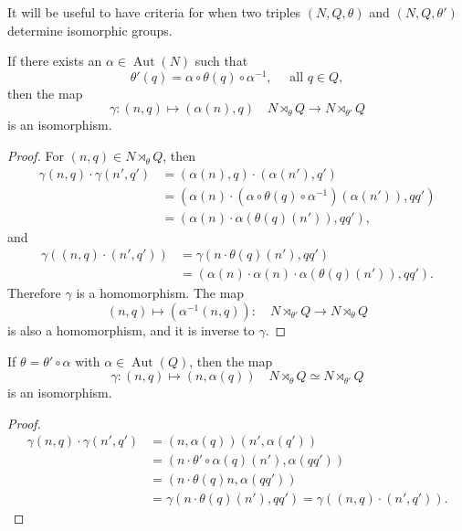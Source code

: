 It will be useful to have criteria for when two triples \( (N, Q, \theta) \) and \( (N, Q, \theta') \) determine isomorphic groups.

\begin{lemma}
  \label{lemma-criteria-semidirect-product-1}
  If there exists an \( \alpha \in \operatorname{Aut}(N) \) such that
  \[
    \theta'(q) = \alpha \circ \theta(q) \circ \alpha^{-1},\quad \text{ all } q \in Q,
  \]
  then the map
  \[
    \gamma: (n, q) \mapsto (\alpha(n), q)\quad N \rtimes_\theta Q \to N \rtimes_{\theta'} Q
  \]
  is an isomorphism.
\end{lemma}
\begin{proof}
  For \( (n, q) \in N \rtimes_\theta Q \), then
  \begin{align*}
    \gamma(n, q) \cdot \gamma(n', q') &= (\alpha(n), q) \cdot (\alpha(n'), q')\\
                                      &=(\alpha(n)\cdot(\alpha \circ \theta(q) \circ \alpha^{-1})(\alpha(n')), qq')\\
                                      &= (\alpha(n) \cdot \alpha(\theta(q)(n')), qq'),
  \end{align*}
  and
  \begin{align*}
    \gamma((n, q) \cdot (n', q')) &= \gamma(n \cdot \theta(q)(n'), qq')\\
                                  &= (\alpha(n)\cdot \alpha(n) \cdot\alpha(\theta(q)(n')), qq').
  \end{align*}
  Therefore \( \gamma \) is a homomorphism.
  The map
  \[
    (n, q) \mapsto (\alpha^{-1}(n, q)): \quad N \rtimes_{\theta'}Q \to N \rtimes_\theta Q
  \]
  is also a homomorphism, and it is inverse to \( \gamma \).
\end{proof}

\begin{lemma}
  \label{lemma-criteria-semidirect-product-2}
  If \( \theta = \theta' \circ \alpha \) with \( \alpha \in \operatorname{Aut}(Q) \), then the map
  \[
    \gamma: (n, q) \mapsto (n, \alpha(q))\quad N \rtimes_\theta Q \simeq N \rtimes_{\theta'}Q
  \]
  is an isomorphism.
\end{lemma}
\begin{proof}
  \begin{align*}
    \gamma(n, q) \cdot \gamma(n', q') &= (n, \alpha(q))(n', \alpha(q'))\\
                                      &= (n \cdot \theta'\circ\alpha(q)(n'), \alpha(qq'))\\
                                      &= (n \cdot \theta(q)n, \alpha(qq'))\\
                                      &= \gamma(n \cdot \theta(q)(n'), qq') = \gamma((n, q)\cdot(n', q')).
  \end{align*}
\end{proof}

